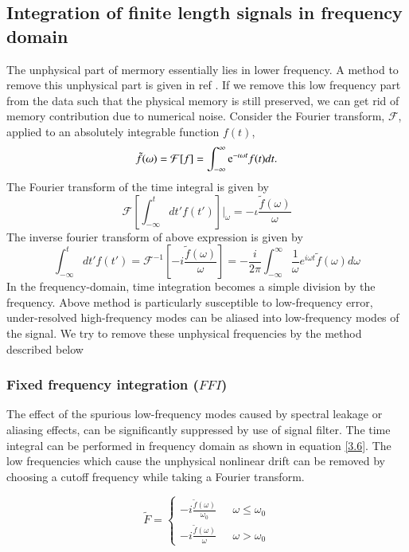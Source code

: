 \documentclass[twocolumn,showpacs,aps,prd,nobibnotes,floatfix]{revtex4-1}
\begin{document}
\subsection{Integration of finite length signals in frequency domain}
The unphysical part of mermory essentially lies in lower frequency. A method to remove this unphysical part is given in ref \cite{Reisswig_Pollney2011}. If we remove this low frequency part from the data such that the physical memory is still preserved, we can get rid of memory contribution due to numerical noise. 
Consider the Fourier transform, $\mathcal{F}$, applied to an absolutely integrable function $f(t)$,
\begin{equation}
	\tilde{f}(\omega) = \mathcal{F}[f]=\int_{-\infty}^{\infty}\mathrm{e}^{-\iota \omega t}f(t)dt.	
\end{equation} 
The Fourier transform of the time integral is given by
\begin{equation}
	\mathcal{F}\left[\int_{-\infty}^{t}dt' f(t')\right] |_\omega = -\iota \frac{\tilde{f}(\omega)}{\omega}
\end{equation}
The inverse fourier transform of above expression is given by
\begin{equation}\label{3.6}
	\int_{-\infty}^{t}dt'f(t')=\mathcal{F}^{-1}\left[-\mathit{i}\frac{\tilde{f}(\omega)}{\omega}\right] = -\frac{\mathit{i}}{2\pi}\int_{-\infty}^{\infty}\frac{1}{\omega}e^{\mathit{i\omega t}}\tilde{f}(\omega)d\omega
\end{equation}
In the frequency-domain, time integration becomes a simple division by the frequency. Above method is particularly susceptible to low-frequency error, under-resolved high-frequency modes can be aliased into low-frequency modes of the signal. We try to remove these unphysical frequencies by the method described below   
\subsubsection{Fixed frequency integration ($\mathit{FFI}$)}\label{FFI}
The effect of the spurious low-frequency modes caused by spectral leakage or aliasing effects, can be significantly suppressed by use of signal filter. The time integral can be performed in frequency domain as shown in equation \ref{3.6}. The low frequencies which cause the unphysical nonlinear drift can be removed by choosing a cutoff frequency while taking a Fourier transform.   

\[\tilde{F} =
\begin{cases}
-\mathit{i} \frac{\tilde{f}(\omega)}{\omega_0} & \text{ $\omega\leq\omega_0$} \\
-\mathit{i} \frac{\tilde{f}(\omega)}{\omega} & \text{ $\omega>\omega_0$} 
\end{cases}\]
\end{document}
